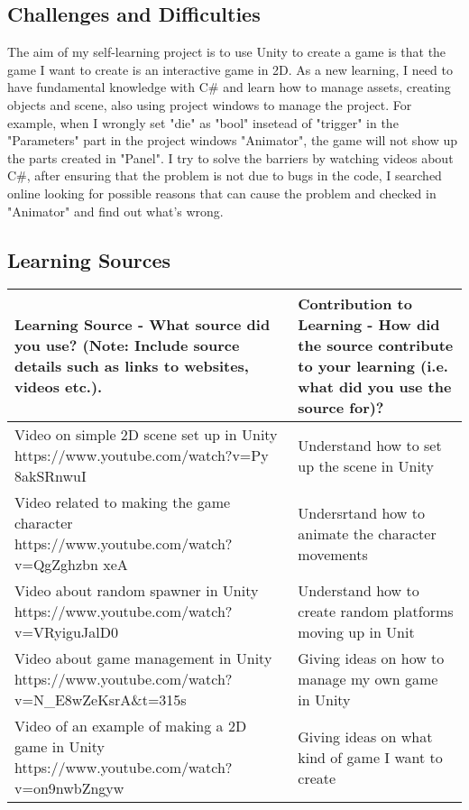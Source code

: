 \documentclass[a4paper, 11pt]{report}
\begin{document}
\subsection{Challenges and Difficulties}
The aim of my self-learning project is to use Unity to create a game is that the game I want to create is an interactive game in 2D.  As a new learning, I need to have fundamental knowledge with C\# and learn how to manage assets, creating objects and scene, also using project windows to manage the project.  For example, when I wrongly set "die" as "bool" insetead of "trigger" in the "Parameters" part in the project windows "Animator", the game will not show up the parts created in "Panel".  I try to solve the barriers by watching videos about C\#,  after ensuring that the problem is not due to bugs in the code, I searched online looking for possible reasons that can cause the problem and checked in "Animator" and find out what's wrong.

\subsection{Learning Sources}
\begin{tabular}{|p{}|p{}|}
	\hline
	Learning Source - What source did you use? (Note: Include source details such as links to websites, videos etc.). & Contribution to Learning - How did the source contribute to your learning (i.e. what did you use the source for)?\\
	\hline
	Video on simple 2D scene set up in Unity https://www.youtube.com/watch?v=Py 8akSRnwuI & Understand how to set up the scene in Unity\\
	\hline
	Video related to making the game character https://www.youtube.com/watch?v=QgZghzbn xeA & Undersrtand how to animate the character movements\\
	\hline
	Video about random spawner in Unity https://www.youtube.com/watch?v=VRyiguJalD0 & Understand how to create random platforms moving up in  Unit\\
	\hline
	Video about game management in Unity https://www.youtube.com/watch?v=N\_E8wZeKsrA\&t=315s & Giving ideas on how to manage my own game in Unity\\
	\hline
	Video of an example of making a 2D game in Unity https://www.youtube.com/watch?v=on9nwbZngyw & Giving ideas on what kind of game I want to create\\
	\hline
\end{tabular}
\end{document}
